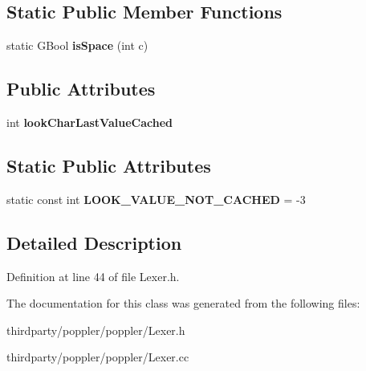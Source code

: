 \subsection*{Static Public Member Functions}
\begin{DoxyCompactItemize}
\item 
\mbox{\label{class_lexer_a2e774798a72a2158a5380338b3ef6d45}} 
static G\+Bool {\bfseries is\+Space} (int c)
\end{DoxyCompactItemize}
\subsection*{Public Attributes}
\begin{DoxyCompactItemize}
\item 
\mbox{\label{class_lexer_a8d0e0fffb769c6489c6bdf886c210669}} 
int {\bfseries look\+Char\+Last\+Value\+Cached}
\end{DoxyCompactItemize}
\subsection*{Static Public Attributes}
\begin{DoxyCompactItemize}
\item 
\mbox{\label{class_lexer_a39df222713a0e45d825eac111929261c}} 
static const int {\bfseries L\+O\+O\+K\+\_\+\+V\+A\+L\+U\+E\+\_\+\+N\+O\+T\+\_\+\+C\+A\+C\+H\+ED} = -\/3
\end{DoxyCompactItemize}


\subsection{Detailed Description}


Definition at line 44 of file Lexer.\+h.



The documentation for this class was generated from the following files\+:\begin{DoxyCompactItemize}
\item 
thirdparty/poppler/poppler/Lexer.\+h\item 
thirdparty/poppler/poppler/Lexer.\+cc\end{DoxyCompactItemize}
